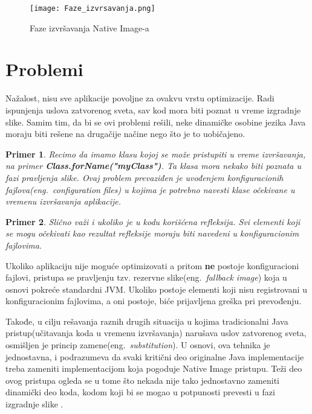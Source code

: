\documentclass[a4paper]{article}
\newtheorem{primer}{Primer}[section]
\begin{document}
\begin{figure}[h!]
\begin{center}
\texttt{[image: Faze\_izvrsavanja.png]}
\end{center}
\caption{Faze izvršavanja Native Image-a}
\label{fig:fazeIzvrsavanja}
\end{figure}


\section{Problemi}
Nažalost, nisu sve aplikacije povoljne za ovakvu vrstu optimizacije. Radi ispunjenja uslova zatvorenog sveta, sav kod mora biti poznat u vreme izgradnje slike. Samim tim, da bi se ovi problemi rešili, neke dinamičke osobine jezika Java moraju biti rešene na drugačije načine nego što je to uobičajeno.


\begin{primer}
Recimo da imamo klasu  kojoj se može pristupiti u vreme izvršavanja, na primer \textbf{Class.forName("myClass")}. Ta klasa mora nekako biti poznata u fazi pravljenja slike. Ovaj problem prevaziđen je uvođenjem konfiguracionih fajlova(eng.~{\em configuration files}) u kojima je potrebno navesti klase očekivane u vremenu izvršavanja aplikacije.
\end{primer}


\begin{primer}
Slično važi i ukoliko je u kodu korišćena refleksija. Svi elementi koji se mogu očekivati kao rezultat refleksije moraju biti navedeni u konfiguracionim fajlovima.
\end{primer}


Ukoliko aplikaciju nije moguće optimizovati a pritom \textbf{ne} postoje konfiguracioni fajlovi, pristupa se
pravljenju tzv. rezervne slike(eng.~{\em fallback image}) koja u osnovi pokreće standardni JVM. Ukoliko
postoje elementi koji nisu registrovani u konfiguracionim fajlovima, a oni postoje, biće prijavljena greška
pri prevođenju. 

Takođe, u cilju rešavanja raznih drugih situacija u kojima tradicionalni Java pristup(učitavanja koda u
vremenu izvršavanja) narušava uslov zatvorenog sveta, osmišljen je princip zamene(eng.~{\em substitution}).
U osnovi, ova tehnika je jednostavna, i podrazumeva da svaki kritični deo originalne Java implementacije treba zameniti implementacijom koja pogoduje Native Image pristupu. Teži deo ovog pristupa ogleda se u tome što nekada nije tako jednostavno zameniti dinamički deo koda, kodom koji bi se mogao u potpunosti prevesti u fazi izgradnje slike \cite{Substitucije}. 
\end{document}
